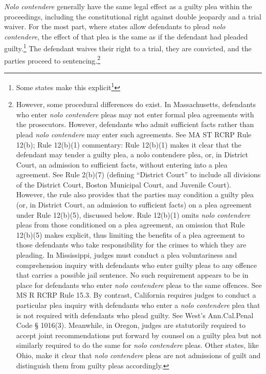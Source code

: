 \textit{Nolo contendere} generally have the same legal effect as a guilty plea within the proceedings, including the constitutional right against double jeopardy and a trial waiver. For the most part, where states allow defendants to plead \textit{nolo contendere}, the effect of that plea is the same as if the defendant had pleaded guilty.\footnote{Some states make this explicit\footnote{See e.g. Oregon (O.R.S. § 135.345. No contest plea as conviction), Rhode Island (RI R REV Rule 609), New Mexico (NM ST § 30-1-11. Criminal sentence permitted only upon conviction), and Louisiana (LA C.Cr.P. Art. 552(4). Pleas at the arraignment)}} The defendant waives their right to a trial, they are convicted, and the parties proceed to sentencing.\footnote{However, some procedural differences do exist. In Massachusetts, defendants who enter \textit{nolo contendere} pleas may not enter formal plea agreements with the prosecutors. However, defendants who admit sufficient facts rather than plead \textit{nolo contendere} may enter such agreements. See MA ST RCRP Rule 12(b); Rule 12(b)(1) commentary: Rule 12(b)(1) makes it clear that the defendant may tender a guilty plea, a nolo contendere plea, or, in District Court, an admission to sufficient facts, without entering into a plea agreement. See Rule 2(b)(7) (defining “District Court” to include all divisions of the District Court, Boston Municipal Court, and Juvenile Court). However, the rule also provides that the parties may condition a guilty plea (or, in District Court, an admission to sufficient facts) on a plea agreement under Rule 12(b)(5), discussed below. Rule 12(b)(1) omits \textit{nolo contendere} pleas from those conditioned on a plea agreement, an omission that Rule 12(b)(5) makes explicit, thus limiting the benefits of a plea agreement to those defendants who take responsibility for the crimes to which they are pleading. In Mississippi, judges must conduct a plea voluntariness and comprehension inquiry with defendants who enter guilty pleas to any offence that carries a possible jail sentence. No such requirement appears to be in place for defendants who enter \textit{nolo contendere} pleas to the same offences. See MS R RCRP Rule 15.3. By contrast, California requires judges to conduct a particular plea inquiry with defendants who enter a \textit{nolo contendere} plea that is not required with defendants who plead guilty. See West's Ann.Cal.Penal Code § 1016(3). Meanwhile, in Oregon, judges are statutorily required to accept joint recommendations put forward by counsel on a guilty plea but not similarly required to do the same for \textit{nolo contendere} pleas. Other states, like Ohio, make it clear that \textit{nolo contendere} pleas are not admissions of guilt and distinguish them from guilty pleas accordingly.}


